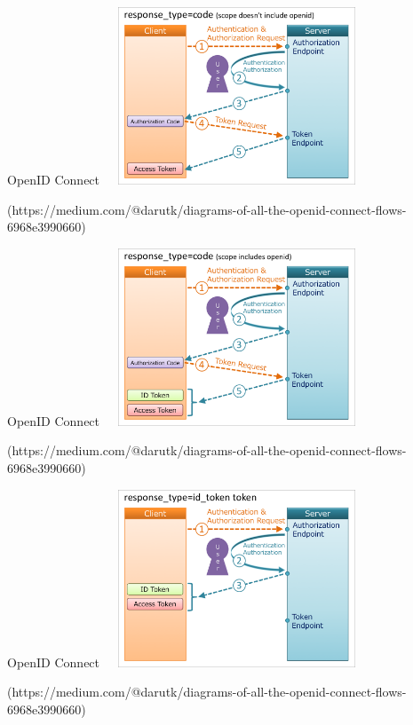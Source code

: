 \documentclass[
]{beamer}
\begin{document}
\begin{frame}{OpenID Connect}
\includegraphics[width=300px,height=200px]{pics/authorization_code_access.png} \\
\begin{tiny}
(https://medium.com/@darutk/diagrams-of-all-the-openid-connect-flows-6968e3990660)
\end{tiny}
\end{frame}

\begin{frame}{OpenID Connect}
\includegraphics[width=300px,height=200px]{pics/authorization_code_both.png} \\
\begin{tiny}
(https://medium.com/@darutk/diagrams-of-all-the-openid-connect-flows-6968e3990660)
\end{tiny}
\end{frame}

\begin{frame}{OpenID Connect}
\includegraphics[width=300px,height=200px]{pics/both.png} \\

\begin{tiny}
(https://medium.com/@darutk/diagrams-of-all-the-openid-connect-flows-6968e3990660)
\end{tiny}
\end{frame}
\end{document}
